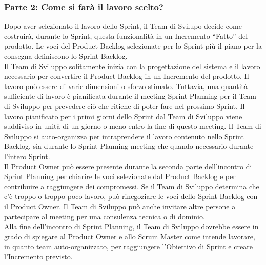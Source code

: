 \subsubsection*{Parte 2: Come si far\`a il lavoro scelto?} %
\label{ssub:parte_2_come_si_otterr`a_quello_che_`e_stato_scelto_}
Dopo aver selezionato il lavoro dello Sprint, il Team di Svilupo decide come costruir\`a, durante lo Sprint, questa 
funzionalit\`a in un Incremento ``Fatto'' del prodotto. Le voci del Product Backlog selezionate per lo Sprint pi\`u il piano 
per la consegna definiscono lo Sprint Backlog. \newline
\\Il Team di Sviluppo solitamente inizia con la progettazione del sistema e il lavoro necessario per convertire il Product 
Backlog in un Incremento del prodotto. Il lavoro pu\`o essere di varie dimensioni o sforzo stimato. Tuttavia, una quantit\`a 
sufficiente di lavoro \`e pianificata durante il meeting Sprint Planning per il Team di Sviluppo per prevedere ci\`o che ritiene 
di poter fare nel prossimo Sprint. Il lavoro pianificato per i primi giorni dello Sprint dal Team di Sviluppo viene suddiviso 
in unit\`a di un giorno o meno entro la fine di questo meeting. Il Team di Sviluppo si auto-organizza per intraprendere il 
lavoro contenuto nello Sprint Backlog, sia durante lo Sprint Planning meeting che quando necessario durante l'intero Sprint. \newline
\\Il Product Owner pu\`o essere presente durante la seconda parte dell'incontro di Sprint Planning per chiarire le voci 
selezionate dal Product Backlog e per contribuire a raggiungere dei compromessi. Se il Team di Sviluppo determina che c'\`e 
troppo o troppo poco lavoro, pu\`o rinegoziare le voci dello Sprint Backlog con il Product Owner. Il Team di Sviluppo pu\`o 
anche invitare altre persone a partecipare al meeting per una consulenza tecnica o di dominio. \newline
\\Alla fine dell'incontro di Sprint Planning, il Team di Sviluppo dovrebbe essere in grado di spiegare al Product Owner e allo 
Scrum Master come intende lavorare, in quanto team auto-organizzato, per raggiungere l'Obiettivo di Sprint e creare 
l'Incremento previsto.


